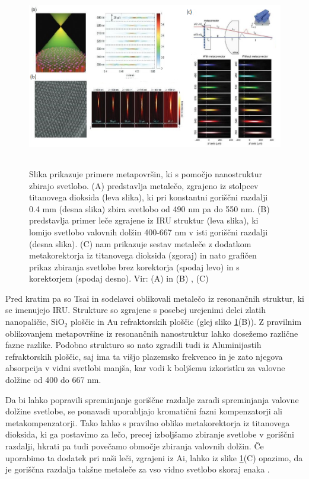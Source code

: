 \documentclass[12pt ]{article}
\begin{document}
   \begin{figure}[H]
     \centering
     \includegraphics[width=12cm, height=8cm]{Slike/Spektrometri.png}
     \caption{Slika prikazuje primere metapovršin, ki s pomočjo nanostruktur zbirajo svetlobo. (A) predstavlja metalečo, zgrajeno iz stolpcev titanovega dioksida (leva slika), ki pri konstantni goriščni razdalji 0.4 mm (desna slika) zbira svetlobo od 490 nm pa do 550 nm. (B) predstavlja primer leče zgrajene iz IRU struktur (leva slika), ki lomijo svetlobo valovnih dolžin 400-667 nm v isti goriščni razdalji (desna slika). (C) nam prikazuje sestav metaleče z dodatkom metakorektorja iz titanovega dioksida (zgoraj) in nato grafičen prikaz zbiranja svetlobe brez korektorja (spodaj levo) in s korektorjem (spodaj desno). Vir: (A) in (B) \cite{Metaleče_opis}, (C) \cite{Geometrija-dodatek} }
     \label{Geometrija-Lec}
 \end{figure}
 Pred kratim pa so Tsai in sodelavci oblikovali metalečo iz resonančnih struktur, ki se imenujejo IRU. Strukture so zgrajene s posebej urejenimi delci zlatih nanopaličic, SiO$_2$ ploščic in Au refraktorskih ploščic (glej sliko \ref{Geometrija-Lec}(B)). Z pravilnim oblikovanjem metapovršine iz resonančnih nanostruktur lahko dosežemo različne fazne razlike. Podobno strukturo so nato zgradili tudi iz Aluminijastih refraktorskih ploščic, saj ima ta višjo plazemsko frekvenco in je zato njegova absorpcija v vidni svetlobi manjša, kar vodi k boljšemu izkoristku za valovne dolžine od 400 do 667 nm.

 
 Da bi lahko popravili spreminjanje goriščne razdalje zaradi spreminjanja valovne dolžine svetlobe, se ponavadi uporabljajo kromatični fazni kompenzatorji ali metakompenzatorji. Tako lahko s pravilno obliko metakorektorja iz titanovega dioksida, ki ga postavimo za lečo, precej izboljšamo zbiranje svetlobe v goriščni razdalji, hkrati pa tudi povečamo območje zbiranja valovnih dolžin. Če uporabimo ta dodatek pri naši leči, zgrajeni iz Ai, lahko iz slike \ref{Geometrija-Lec}(C) opazimo, da je goriščna razdalja takšne metaleče za vso vidno svetlobo skoraj enaka \cite{Geometrija-dodatek}.
 
\end{document}
